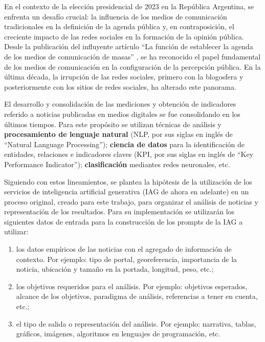 \documentclass[12pt]{article}
\begin{document}
En el contexto de la elección presidencial de 2023 en la República Argentina, se enfrenta un desafío crucial: la influencia de los medios de comunicación tradicionales en la definición de la agenda pública y, en contraposición, el creciente impacto de las redes sociales en la formación de la opinión pública. Desde la publicación del influyente artículo ``La función de establecer la agenda de los medios de comunicación de masas'' \cite{mccombs:1972}, se ha reconocido el papel fundamental de los medios de comunicación en la configuración de la percepción pública. En la última década, la irrupción de las redes sociales, primero con la blogosfera y posteriormente con los sitios de redes sociales, ha alterado este panorama.


El desarrollo y consolidación de las mediciones y obtención de indicadores referido a noticias publicadas en medios digitales se fue consolidando en los últimos tiempos. Para este propósito se utilizan técnicas de análisis y \textbf{procesamiento de lenguaje natural} (NLP, por sus siglas en inglés de ``Natural Language Processing''); \textbf{ciencia de datos} para la identificación de entidades, relaciones e indicadores claves (KPI, por sus siglas en inglés de ``Key Performance Indicator''); \textbf{clasificación} mediantes redes neuronales, etc. 

Siguiendo con estos lineamientos, se plantea la hipótesis de la utilización de los servicios de inteligencia artificial generativa (IAG de ahora en adelante) en un proceso original, creado para este trabajo, para organizar el análisis de noticias y representación de los resultados. Para su implementación se utilizarán los siguientes datos de entrada para la construcción de los prompts de la IAG a utilizar: 

    \begin{enumerate}
        \item los datos empíricos de las noticias con el agregado de información de contexto. Por ejemplo:  tipo de portal, georeferencia, importancia de la noticia, ubicación y tamaño en la portada, longitud, peso, etc.;
        \item los objetivos requeridos para el análisis. Por ejemplo: objetivos esperados, alcance de los objetivos, paradigma de análisis, referencias a tener en cuenta, etc.;
        \item el tipo de salida o representación del análisis. Por ejemplo: narrativa, tablas, gráficos, imágenes, algoritmos en lenguajes de programación, etc.
    \end{enumerate}
\end{document}
